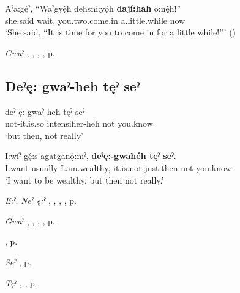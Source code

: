 \ea
\label{ex:dpart9}
\gll Aˀa:gę́ˀ, “Waˀgyę́h de̱hsni:yǫ́h \textbf{dají:hah} o:nę́h!” \\
she.said wait, you.two.come.in a.little.while now\\
\glt ‘She said, “It is time for you to come in for a little while!”’ (\cite{henry_de_2005})
\z

\begin{CayugaRelated}
\item \textit{Gwaˀ} , , , , p. \pageref{p:[gwaˀ] ‘immediately’}
\end{CayugaRelated}

\subsection*{\textbf{Deˀę: gwaˀ-heh tęˀ seˀ} } \label{p:[deˀę: gwaˀ-heh tęˀ seˀ]}

\ea
\label{ex:dpart29}
\gll deˀ-ę: gwaˀ-heh tęˀ seˀ\\
not-it.is.so intensifier-heh not you.know\\
\glt ‘but then, not really’
\z

\ea
\label{ex:dpart30}
\gll I:wíˀ gę́:s agatganǫ́:niˀ, \textbf{deˀę:-gwahéh tęˀ seˀ}. \\
I.want usually I.am.wealthy, it.is.not-just.then not you.know\\
\glt ‘I want to be wealthy, but then not really.’
\z

\begin{CayugaRelated}
\item \textit{E:ˀ}, \textit{Neˀ ę:ˀ} , , , , p. \pageref{p:[ę:ˀ], [neˀ ę:ˀ] `isn’t it so?’}\\
\item \textit{Gwaˀ} , , , , p. \pageref{p:[gwaˀ] ‘immediately’}\\
\item {} , p. \pageref{p:[-heh]}\\
\item\textit{Seˀ} , p. \pageref{p:[seˀ]}\\
\item\textit{Tęˀ} , , p. \pageref{p:[tęˀ]}
\end{CayugaRelated}

